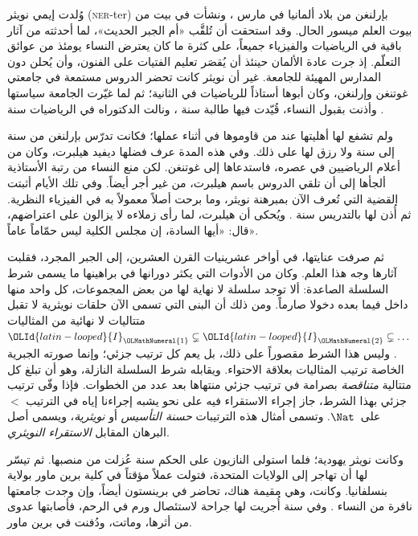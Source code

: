\documentclass[../../../include/open-logic-section]{subfiles}
\begin{document}



وُلدت إيمي نويثر (\textsc{ner}-ter) بإرلنغن من بلاد ألمانيا في  مارس
، ونشأت في بيت من بيوت العلم ميسور الحال. وقد استحقت أن تُلقَّب «أم
الجبر الحديث»، لما أحدثته من آثار باقية في الرياضيات والفيزياء جميعاً،
على كثرة ما كان يعترض النساء يومئذ من عوائق التعلّم. إذ جرت عادة الألمان
حينئذ أن يُقصَر تعليم الفتيات على الفنون، وأن يُحلن دون المدارس المهيئة
للجامعة. غير أن نويثر كانت تحضر الدروس مستمعة في جامعتي غوتنغن وإرلنغن،
وكان أبوها أستاذاً للرياضيات في الثانية؛ ثم لما غيّرت الجامعة سياستها
وأذنت بقبول النساء، قُيّدت فيها طالبة سنة ، ونالت الدكتوراه في
الرياضيات سنة .

ولم تشفع لها أهليتها عند من قاوموها في أثناء عملها؛ فكانت تدرّس بإرلنغن
من سنة  إلى سنة  ولا رزق لها على ذلك. وفي هذه المدة عرف فضلها
ديفيد هيلبرت، وكان من أعلام الرياضيين في عصره، فاستدعاها إلى غوتنغن. لكن
منع النساء من رتبة الأستاذية ألجأها إلى أن تلقي الدروس باسم هيلبرت، من غير
أجر أيضاً. وفي تلك الأيام أثبتت القضية التي تُعرف الآن بمبرهنة نويثر، وما
برحت أصلاً معمولاً به في الفيزياء النظرية. ثم أُذن لها بالتدريس سنة .
ويُحكى أن هيلبرت، لما رأى زملاءه لا يزالون على اعتراضهم، قال: «أيها
السادة، إن مجلس الكلية ليس حمّاماً عاماً».

ثم صرفت عنايتها، في أواخر عشرينيات القرن العشرين، إلى الجبر المجرد، فقلبت
آثارها وجه هذا العلم. وكان من الأدوات التي يكثر دورانها في براهينها ما
يسمى شرط السلسلة الصاعدة: ألا توجد سلسلة لا نهاية لها من بعض المجموعات،
كل واحد منها داخل فيما بعده دخولا صارماً. ومن ذلك أن البنى التي تسمى الآن
حلقات نويثرية لا تقبل متتاليات لا نهائية من المثاليات
$\OLId{latin-looped}{I}_\OLMathNumeral{1} \subsetneq \OLId{latin-looped}{I}_\OLMathNumeral{2} \subsetneq \dots$. وليس هذا الشرط مقصوراً على ذلك،
بل يعم كل ترتيب جزئي؛ وإنما صورته الجبرية الخاصة ترتيب المثاليات بعلاقة
الاحتواء. ويقابله شرط السلسلة النازلة، وهو أن تبلغ كل متتالية
\emph{متناقصة} بصرامة في ترتيب جزئي منتهاها بعد عدد من الخطوات. فإذا وفّى
ترتيب جزئي بهذا الشرط، جاز إجراء الاستقراء فيه على نحو يشبه إجراءنا إياه
في الترتيب $<$ على~$\Nat$. وتسمى أمثال هذه الترتيبات \emph{حسنة
التأسيس} أو \emph{نويثرية}، ويسمى أصل البرهان المقابل \emph{الاستقراء
النويثري}.

وكانت نويثر يهودية؛ فلما استولى النازيون على الحكم سنة  عُزلت من
منصبها. ثم تيسّر لها أن تهاجر إلى الولايات المتحدة، فتولت عملاً مؤقتاً في
كلية برين ماور بولاية بنسلفانيا. وكانت، وهي مقيمة هناك، تحاضر في برينستون
أيضاً، وإن وجدت جامعتها نافرة من النساء \citep[81]{Dick1981}. وفي سنة
 أُجريت لها جراحة لاستئصال ورم في الرحم، فأصابتها عدوى من أثرها،
وماتت، ودُفنت في برين ماور.
\end{document}
